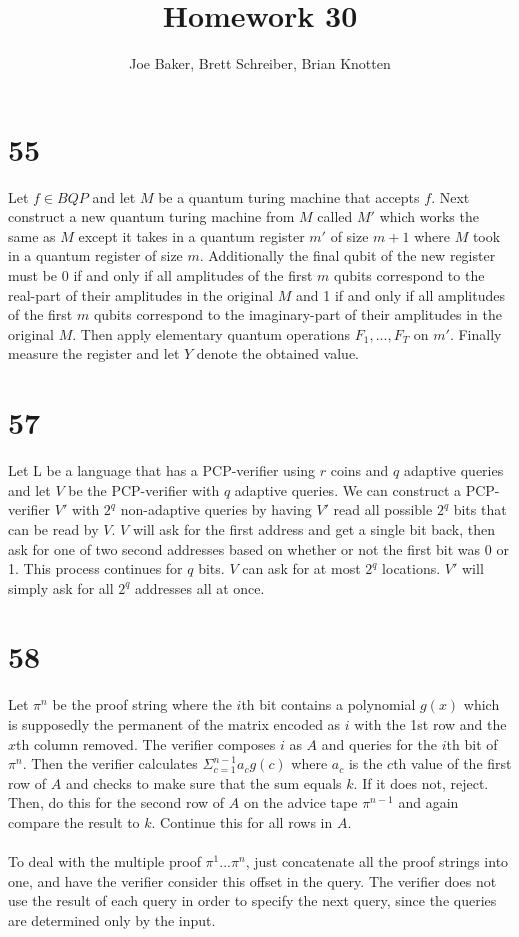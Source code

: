 \documentclass[letterpaper,notitlepage,twoside]{article}
\begin{document}
\title{Homework 30}
\author{Joe Baker, Brett Schreiber, Brian Knotten}
\maketitle

\section*{55}
Let $f \in BQP$ and let $M$ be a quantum turing machine that accepts $f$. Next construct a new quantum turing machine from $M$ called $M'$ which works the same as $M$ except it takes in a quantum register $m'$ of size $m+1$ where $M$ took in a quantum register of size $m$. Additionally the final qubit of the new register must be 0 if and only if all amplitudes of the first $m$ qubits correspond to the real-part of their amplitudes in the original $M$ and 1 if and only if all amplitudes of the first $m$ qubits correspond to the imaginary-part of their amplitudes in the original $M$. Then apply elementary quantum operations $F_1,...,F_T$ on $m'$. Finally measure the register and let $Y$ denote the obtained value.

\section*{57}
Let L be a language that has a PCP-verifier using $r$ coins and $q$ adaptive queries and let $V$ be the PCP-verifier with $q$ adaptive queries. We can construct a PCP-verifier $V'$ with $2^q$ non-adaptive queries by having $V'$ read all possible $2^q$ bits that can be read by $V$. $V$ will ask for the first address and get a single bit back, then ask for one of two second addresses based on whether or not the first bit was 0 or 1. This process continues for $q$ bits. $V$ can ask for at most $2^q$ locations. $V'$ will simply ask for all $2^q$ addresses all at once.
\section*{58}
Let $\pi^n$ be the proof string where the $i$th bit contains a polynomial $g(x)$ which is supposedly the permanent of the matrix encoded as $i$ with the 1st row and the $x$th column removed. The verifier composes $i$ as $A$ and queries for the $i$th bit of $\pi^n$. Then the verifier calculates $\Sigma_{c = 1}^{n - 1}a_cg(c)$ where $a_c$ is the $c$th value of the first row of $A$ and checks to make sure that the sum equals $k$. If it does not, reject. Then, do this for the second row of $A$ on the advice tape $\pi^{n - 1}$ and again compare the result to $k$. Continue this for all rows in $A$. \\\\
To deal with the multiple proof $\pi^1...\pi^n$, just concatenate all the proof strings into one, and have the verifier consider this offset in the query. The verifier does not use the result of each query in order to specify the next query, since the queries are determined only by the input.
\end{document}
